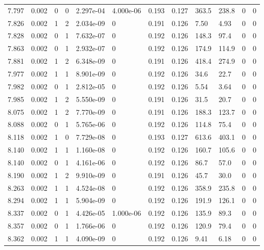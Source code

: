 \documentclass[preview]{standalone}
\begin{document}
{{{{{{\begin{tabular}{L{1.2cm}C{1.2cm} C{0.3cm}C{0.5cm} C{1.4cm}C{1.4cm} C{1.4cm}C{1.4cm} C{1.6cm}C{1.6cm} C{1.6cm}C{1.6cm}}
  7.797  &  0.002  & 0     &  0 &  2.297e-04  & 4.000e-06  &  0.193&   0.127& 363.5 & 238.8   &  0 & 0  \\ 
  7.826  &  0.002  & 1     &  2 &  2.034e-09  & 0  &  0.191&   0.126& 7.50 & 4.93   &  0 & 0  \\ 
  7.828  &  0.002  & 0     &  1 &  7.632e-07  & 0  &  0.192&   0.126& 148.3 & 97.4   &  0 & 0  \\ 
  7.863  &  0.002  & 0     &  1 &  2.932e-07  & 0  &  0.192&   0.126& 174.9 & 114.9   &  0 & 0  \\ 
  7.881  &  0.002  & 1     &  2 &  6.348e-09  & 0  &  0.191&   0.126& 418.4 & 274.9   &  0 & 0  \\ 
  7.977  &  0.002  & 1     &  1 &  8.901e-09  & 0  &  0.192&   0.126& 34.6 & 22.7   &  0 & 0  \\ 
  7.982  &  0.002  & 0     &  1 &  2.812e-05  & 0  &  0.192&   0.126& 5.54 & 3.64   &  0 & 0  \\ 
  7.985  &  0.002  & 1     &  2 &  5.550e-09  & 0  &  0.191&   0.126& 31.5 & 20.7   &  0 & 0  \\ 
  8.075  &  0.002  & 1     &  2 &  7.770e-09  & 0  &  0.191&   0.126& 188.3 & 123.7   &  0 & 0  \\ 
  8.088  &  0.002  & 0     &  1 &  5.765e-06  & 0  &  0.192&   0.126& 114.8 & 75.4   &  0 & 0  \\ 
  8.118  &  0.002  & 1     &  0 &  7.729e-08  & 0  &  0.193&   0.127& 613.6 & 403.1   &  0 & 0  \\ 
  8.140  &  0.002  & 1     &  1 &  1.160e-08  & 0  &  0.192&   0.126& 160.7 & 105.6   &  0 & 0  \\ 
  8.140  &  0.002  & 0     &  1 &  4.161e-06  & 0  &  0.192&   0.126& 86.7 & 57.0   &  0 & 0  \\ 
  8.190  &  0.002  & 1     &  2 &  9.910e-09  & 0  &  0.191&   0.126& 45.7 & 30.0   &  0 & 0  \\ 
  8.263  &  0.002  & 1     &  1 &  4.524e-08  & 0  &  0.192&   0.126& 358.9 & 235.8   &  0 & 0  \\ 
  8.294  &  0.002  & 1     &  1 &  5.904e-09  & 0  &  0.192&   0.126& 191.9 & 126.1   &  0 & 0  \\ 
  8.337  &  0.002  & 0     &  1 &  4.426e-05  & 1.000e-06  &  0.192&   0.126& 135.9 & 89.3   &  0 & 0  \\ 
  8.357  &  0.002  & 0     &  1 &  1.766e-06  & 0  &  0.192&   0.126& 120.9 & 79.4   &  0 & 0  \\ 
  8.362  &  0.002  & 1     &  1 &  4.090e-09  & 0  &  0.192&   0.126& 9.41 & 6.18   &  0 & 0  \\ 

\end{tabular}}}}}}}
\end{document}

